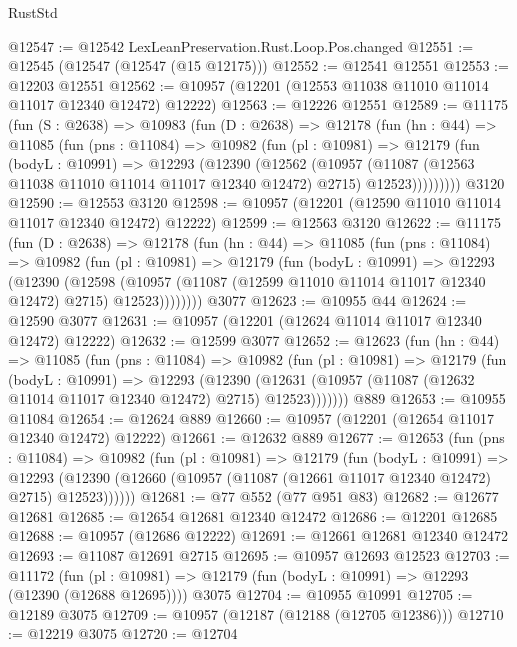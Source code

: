 \begin{lexlean}{RustStd}
\begin{coremodule}
{\begin{coremodule}
{{{{{{{{{{{{{{{{{{{{{{{{{{{{{{{{{@12547 := @12542 LexLeanPreservation.Rust.Loop.Pos.changed
@12551 := @12545 (@12547 (@12547 (@15 @12175)))
@12552 := @12541 @12551
@12553 := @12203 @12551
@12562 := @10957 (@12201 (@12553 @11038 @11010 @11014 @11017 @12340 @12472) @12222)
@12563 := @12226 @12551
@12589 := @11175
    (fun (S : @2638) =>
    @10983
      (fun (D : @2638) =>
      @12178
        (fun (hn : @44) =>
        @11085
          (fun (pns : @11084) =>
          @10982
            (fun (pl : @10981) =>
            @12179
              (fun (bodyL : @10991) =>
              @12293
                (@12390
                  (@12562
                    (@10957
                      (@11087 (@12563 @11038 @11010 @11014 @11017 @12340 @12472) @2715)
                      @12523)))))))))
    @3120
@12590 := @12553 @3120
@12598 := @10957 (@12201 (@12590 @11010 @11014 @11017 @12340 @12472) @12222)
@12599 := @12563 @3120
@12622 := @11175
    (fun (D : @2638) =>
    @12178
      (fun (hn : @44) =>
      @11085
        (fun (pns : @11084) =>
        @10982
          (fun (pl : @10981) =>
          @12179
            (fun (bodyL : @10991) =>
            @12293
              (@12390
                (@12598
                  (@10957 (@11087 (@12599 @11010 @11014 @11017 @12340 @12472) @2715) @12523))))))))
    @3077
@12623 := @10955 @44
@12624 := @12590 @3077
@12631 := @10957 (@12201 (@12624 @11014 @11017 @12340 @12472) @12222)
@12632 := @12599 @3077
@12652 := @12623
    (fun (hn : @44) =>
    @11085
      (fun (pns : @11084) =>
      @10982
        (fun (pl : @10981) =>
        @12179
          (fun (bodyL : @10991) =>
          @12293
            (@12390
              (@12631 (@10957 (@11087 (@12632 @11014 @11017 @12340 @12472) @2715) @12523)))))))
    @889
@12653 := @10955 @11084
@12654 := @12624 @889
@12660 := @10957 (@12201 (@12654 @11017 @12340 @12472) @12222)
@12661 := @12632 @889
@12677 := @12653
    (fun (pns : @11084) =>
    @10982
      (fun (pl : @10981) =>
      @12179
        (fun (bodyL : @10991) =>
        @12293 (@12390 (@12660 (@10957 (@11087 (@12661 @11017 @12340 @12472) @2715) @12523))))))
@12681 := @77 @552 (@77 @951 @83)
@12682 := @12677 @12681
@12685 := @12654 @12681 @12340 @12472
@12686 := @12201 @12685
@12688 := @10957 (@12686 @12222)
@12691 := @12661 @12681 @12340 @12472
@12693 := @11087 @12691 @2715
@12695 := @10957 @12693 @12523
@12703 := @11172
    (fun (pl : @10981) => @12179 (fun (bodyL : @10991) => @12293 (@12390 (@12688 @12695))))
    @3075
@12704 := @10955 @10991
@12705 := @12189 @3075
@12709 := @10957 (@12187 (@12188 (@12705 @12386)))
@12710 := @12219 @3075
@12720 := @12704
}}}}}}}}}}}}}}}}}}}}}}}}}}}}}}}}}
\end{coremodule}}
\end{coremodule}
\end{lexlean}
